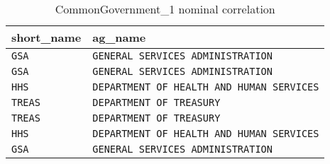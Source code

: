 \begin{table}[h]
\centering
\begin{tabular}{@{}ll@{}}
\toprule
short\_name  & ag\_name                                       \\ \midrule
\verb|GSA|   & \verb|GENERAL SERVICES ADMINISTRATION|         \\
\verb|GSA|   & \verb|GENERAL SERVICES ADMINISTRATION|         \\
\verb|HHS|   & \verb|DEPARTMENT OF HEALTH AND HUMAN SERVICES| \\
\verb|TREAS| & \verb|DEPARTMENT OF TREASURY|                  \\
\verb|TREAS| & \verb|DEPARTMENT OF TREASURY|                  \\
\verb|HHS|   & \verb|DEPARTMENT OF HEALTH AND HUMAN SERVICES| \\
\verb|GSA|   & \verb|GENERAL SERVICES ADMINISTRATION|         \\ \bottomrule
\end{tabular}
\caption{CommonGovernment\_1 nominal correlation}
\label{tab:pd:columncorrelation:nominalexample}
\end{table}
